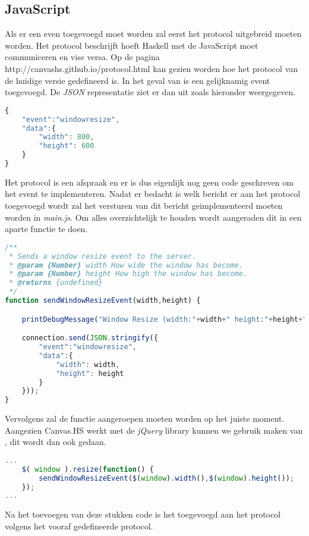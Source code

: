 \subsection{JavaScript}
Als er een even toegevoegd moet worden zal eerst het protocol uitgebreid moeten worden. Het protocol beschrijft hoeft Haskell met de JavaScript moet communiceren en vise versa. Op de pagina http://canvashs.github.io/protocol.html kan gezien worden hoe het protocol van de huidige versie gedefineerd is. In het geval van  is een gelijknamig event toegevoegd. De \emph{JSON} representatie ziet er dan uit zoals hieronder weergegeven.
\begin{lstlisting}[style=densecode, language=JavaScript]
{
    "event":"windowresize",
    "data":{
        "width": 800,
        "height": 600
    }
}
\end{lstlisting}
Het protocol is een afspraak en er is dus eigenlijk nog geen code geschreven om het event te implementeren. Nadat er bedacht is welk bericht er aan het protocol toegevoegd wordt zal het versturen van dit bericht geimplementeerd moeten worden in \emph{main.js}. Om alles overzichtelijk te houden wordt aangeraden dit in een aparte functie te doen.
\begin{lstlisting}[style=densecode, language=JavaScript]
/**
 * Sends a window resize event to the server.
 * @param {Number} width How wide the window has become.
 * @param {Number} height How high the window has become.
 * @returns {undefined}
 */
function sendWindowResizeEvent(width,height) {

    printDebugMessage("Window Resize (width:"+width+" height:"+height+")",0);

    connection.send(JSON.stringify({
        "event":"windowresize",
        "data":{
            "width": width,
            "height": height
        }
    }));
}
\end{lstlisting}
Vervolgens zal de functie  aangeroepen moeten worden op het juiste moment. Aangezien Canvas.HS werkt met de \emph{jQuery} library kunnen we gebruik maken van , dit wordt dan ook gedaan.
\begin{lstlisting}[style=densecode, language=JavaScript]
...
    $( window ).resize(function() {
        sendWindowResizeEvent($(window).width(),$(window).height());
    });
...
\end{lstlisting}
Na het toevoegen van deze stukken code is het  toegevoegd aan het protocol volgens het vooraf gedefineerde protocol.
